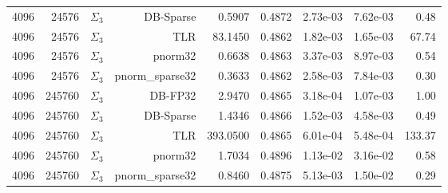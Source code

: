 \begin{tabular}{|r|r|r|r|r|r|r|r|r|}
  4096 & 24576 & $\Sigma_3$ & DB-Sparse & 0.5907 & 0.4872 & 2.73e-03 & 7.62e-03 & 0.48 \\
  4096 & 24576 & $\Sigma_3$ & TLR & 83.1450 & 0.4862 & 1.82e-03 & 1.65e-03 & 67.74 \\
  4096 & 24576 & $\Sigma_3$ & pnorm32 & 0.6638 & 0.4863 & 3.37e-03 & 8.97e-03 & 0.54 \\
  4096 & 24576 & $\Sigma_3$ & pnorm\_sparse32 & 0.3633 & 0.4862 & 2.58e-03 & 7.84e-03 & 0.30 \\
  4096 & 245760 & $\Sigma_3$ & DB-FP32 & 2.9470 & 0.4865 & 3.18e-04 & 1.07e-03 & 1.00 \\
  4096 & 245760 & $\Sigma_3$ & DB-Sparse & 1.4346 & 0.4866 & 1.52e-03 & 4.58e-03 & 0.49 \\
  4096 & 245760 & $\Sigma_3$ & TLR & 393.0500 & 0.4865 & 6.01e-04 & 5.48e-04 & 133.37 \\
  4096 & 245760 & $\Sigma_3$ & pnorm32 & 1.7034 & 0.4896 & 1.13e-02 & 3.16e-02 & 0.58 \\
  4096 & 245760 & $\Sigma_3$ & pnorm\_sparse32 & 0.8460 & 0.4875 & 5.13e-03 & 1.50e-02 & 0.29 \\
  \hline
\end{tabular}
